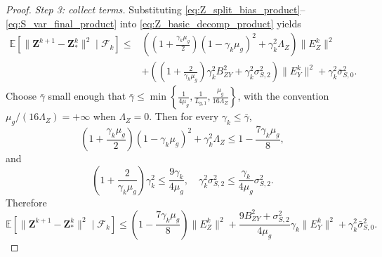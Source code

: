 \documentclass{pkumelon}
\theoremstyle{plain}
\newcommand{\E}{\mathbb{E}}
\begin{document}
\begin{proof}
\emph{Step 3: collect terms.} Substituting \eqref{eq:Z_split_bias_product}--\eqref{eq:S_var_final_product} into \eqref{eq:Z_basic_decomp_product} yields
\begin{equation}\label{eq:Z_rec_pre_product}
\begin{aligned}
\E[\|\boldsymbol Z^{k+1}-\boldsymbol Z_*^k\|^2\mid \mathcal F_k]
\le{}&
\left(\left(1+\frac{\gamma_k\mu_g}{2}\right)(1-\gamma_k\mu_g)^2+\gamma_k^2\Lambda_Z\right)\|E_Z^k\|^2 \\
&+\left(\left(1+\frac{2}{\gamma_k\mu_g}\right)\gamma_k^2 B_{ZY}^2+\gamma_k^2\sigma_{S,2}^2\right)\|E_Y^k\|^2+\gamma_k^2\bar\sigma_{S,0}^2.
\end{aligned}
\end{equation}
Choose $\bar\gamma$ small enough that $\bar\gamma\le \min\left\{\frac{1}{4\mu_g},\frac{1}{L_{g,1}},\frac{\mu_g}{16\Lambda_Z}\right\}$, with the convention $\mu_g/(16\Lambda_Z)=+\infty$ when $\Lambda_Z=0$. Then for every $\gamma_k\le \bar\gamma$,
\begin{equation*}
\left(1+\frac{\gamma_k\mu_g}{2}\right)(1-\gamma_k\mu_g)^2+\gamma_k^2\Lambda_Z \le 1-\frac{7\gamma_k\mu_g}{8},
\end{equation*}
and
\begin{equation*}
\left(1+\frac{2}{\gamma_k\mu_g}\right)\gamma_k^2 \le \frac{9\gamma_k}{4\mu_g}, \quad \gamma_k^2\sigma_{S,2}^2\le \frac{\gamma_k}{4\mu_g}\sigma_{S,2}^2.
\end{equation*}
Therefore
\begin{equation}\label{eq:Z_rec_simplified_product}
\E[\|\boldsymbol Z^{k+1}-\boldsymbol Z_*^k\|^2\mid \mathcal F_k]
\le
\left(1-\frac{7\gamma_k\mu_g}{8}\right)\|E_Z^k\|^2
+\frac{9B_{ZY}^2+\sigma_{S,2}^2}{4\mu_g}\gamma_k\|E_Y^k\|^2
+\gamma_k^2\bar\sigma_{S,0}^2.
\end{equation}


\end{proof}
\end{document}

